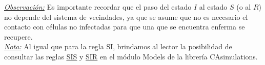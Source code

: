 \underline{\textit{Observación:}} Es importante recordar que el paso del estado $I$ al estado $S$ (o al $R$) no depende del sistema de vecindades, ya que se asume que no es necesario el contacto con células no infectadas para que una que se encuentra enferma se recupere. \\

\underline{\textit{Nota:}} Al igual que para la regla SI, brindamos al lector la posibilidad de consultar las reglas \href{https://github.com/Grupo-de-simulacion-con-automatas/Prediccion-del-comportamiento-de-una-enfermedad-simulada-en-AC-con-un-algoritmo-en-RN/blob/master/Codigo/EpidemiologicalModels/Models.py#:~:text=class-,SISmodel,-(SImodel)\%3A}{\underline{SIS}} y \href{https://github.com/Grupo-de-simulacion-con-automatas/Prediccion-del-comportamiento-de-una-enfermedad-simulada-en-AC-con-un-algoritmo-en-RN/blob/master/Codigo/EpidemiologicalModels/Models.py#:~:text=class-,SIRmodel,-(SImodel)\%3A}{\underline{SIR}} en el módulo Models de la librería CAsimulations.

